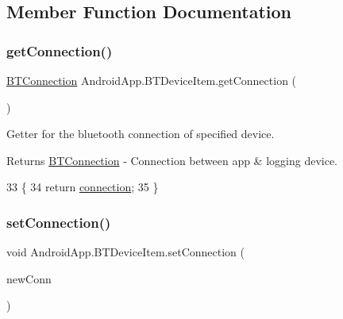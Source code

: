 \subsection{Member Function Documentation}
\mbox{\label{class_android_app_1_1_b_t_device_item_af256e53bf23dd3f969b14e0566a7b785}} 
\subsubsection{\texorpdfstring{get\+Connection()}{getConnection()}}
{\footnotesize\ttfamily \hyperlink{class_android_app_1_1_b_t_connection}{B\+T\+Connection} Android\+App.\+B\+T\+Device\+Item.\+get\+Connection (\begin{DoxyParamCaption}{ }\end{DoxyParamCaption})\hspace{0.3cm}{\ttfamily [inline]}}



Getter for the bluetooth connection of specified device. 

\begin{DoxyReturn}{Returns}
\hyperlink{class_android_app_1_1_b_t_connection}{B\+T\+Connection} -\/ Connection between app \& logging device. 
\end{DoxyReturn}

\begin{DoxyCode}
33                                         \{
34         \textcolor{keywordflow}{return} \hyperlink{class_android_app_1_1_b_t_device_item_a9a95ded58a8607664d020946e4e38364}{connection};
35     \}
\end{DoxyCode}
\mbox{\label{class_android_app_1_1_b_t_device_item_a7fa3ffc652503e2a767e6cfb74a2fe55}} 
\subsubsection{\texorpdfstring{set\+Connection()}{setConnection()}}
{\footnotesize\ttfamily void Android\+App.\+B\+T\+Device\+Item.\+set\+Connection (\begin{DoxyParamCaption}\item[{\hyperlink{class_android_app_1_1_b_t_connection}{B\+T\+Connection}}]{new\+Conn }\end{DoxyParamCaption})\hspace{0.3cm}{\ttfamily [inline]}}




